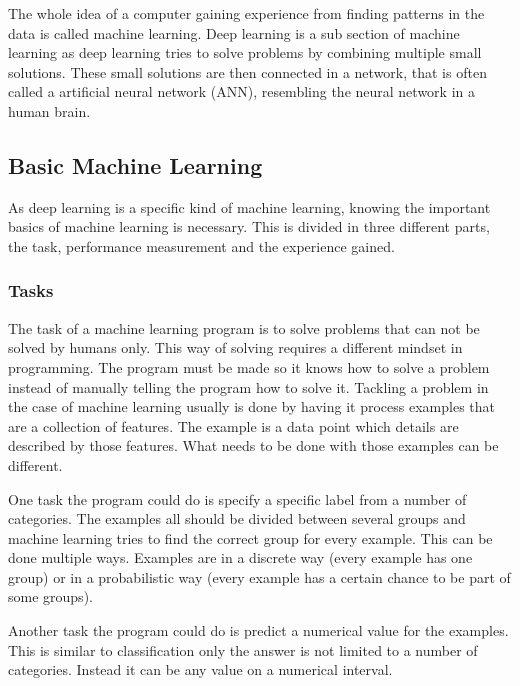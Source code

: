 \documentclass[10pt,a4paper]{article}
\begin{document}
	The whole idea of a computer gaining experience from finding patterns in 
	the data is called machine learning. Deep learning is a sub section of 
	machine learning as deep learning tries to solve problems by combining 
	multiple small solutions. These small solutions are then connected in a 
	network, that is often called a artificial neural network (ANN), resembling 
	the neural network in a human brain.\cite{Goodfellow-et-al-2016}
	
	\clearpage
	
	\subsection{Basic Machine Learning}
	\label{subsec:MachineLearning}
	
	As deep learning is a specific kind of machine learning, knowing the 
	important basics of machine learning is necessary. This is divided in three 
	different parts, the task, performance measurement and the experience 
	gained.\cite{Goodfellow-et-al-2016}
	
	\subsubsection{Tasks}
	
	The task of a machine learning program is to solve problems that can not be 
	solved by humans only. This way of solving requires a different mindset in 
	programming. The program must be made so it knows how to solve a problem 
	instead of manually telling the program how to solve it. Tackling a problem 
	in the case of machine learning usually is done by having it process 
	examples that are a collection of features. The example is a data point 
	which details are described by those features. What needs to be done with 
	those examples can be different.\cite{Goodfellow-et-al-2016}
	
	One task the program could do is specify a specific label from a number of 
	categories. The examples all should be divided between several groups and 
	machine learning tries to find the correct group for every example. This 
	can be done multiple ways. Examples are in a discrete way (every example 
	has one group) or in a probabilistic way (every example has a certain 
	chance to be part of some groups).\cite{Goodfellow-et-al-2016}
	
	Another task the program could do is predict a numerical value for the 
	examples. This is similar to classification only the answer is not limited 
	to a number of categories. Instead it can be any value on a numerical 
	interval. \cite{Goodfellow-et-al-2016}
	
\end{document}
